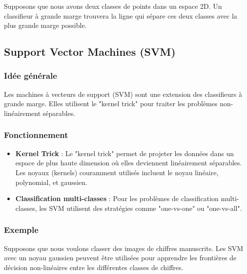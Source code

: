 \documentclass[10pt,a4paper]{article}
\begin{document}
Supposons que nous avons deux classes de points dans un espace 2D. Un classifieur à grande marge trouvera la ligne qui sépare ces deux classes avec la plus grande marge possible.

\subsection*{Support Vector Machines (SVM)}

\subsubsection*{Idée générale}

Les machines à vecteurs de support (SVM) sont une extension des classifieurs à grande marge. Elles utilisent le "kernel trick" pour traiter les problèmes non-linéairement séparables.

\subsubsection*{Fonctionnement}

\begin{itemize}
    \item \textbf{Kernel Trick} :
    Le "kernel trick" permet de projeter les données dans un espace de plus haute dimension où elles deviennent linéairement séparables. Les noyaux (kernels) couramment utilisés incluent le noyau linéaire, polynomial, et gaussien.

    \item \textbf{Classification multi-classes} :
    Pour les problèmes de classification multi-classes, les SVM utilisent des stratégies comme "one-vs-one" ou "one-vs-all".
\end{itemize}

\subsubsection*{Exemple}

Supposons que nous voulons classer des images de chiffres manuscrits. Les SVM avec un noyau gaussien peuvent être utilisées pour apprendre les frontières de décision non-linéaires entre les différentes classes de chiffres.
\end{document}
